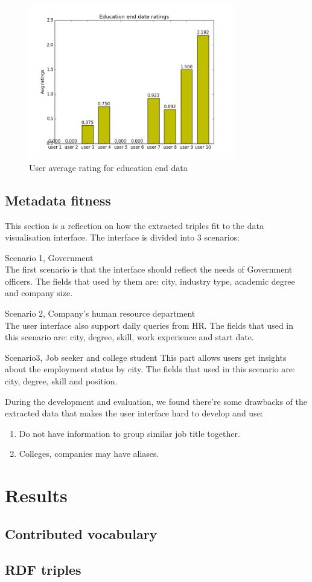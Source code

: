 \begin{figure}[H]
\centering
\includegraphics[width=90mm]{images/evaluation/average_education_end_date_score.png}
\caption{User average rating for education end data}
\label{fig:educationend}
\end{figure}

\subsection{Metadata fitness}

This section is a reflection on how the extracted triples fit to the data visualisation interface. The interface is divided into 3 scenarios: 

\begin{description}
	\item Scenario 1, Government \hfill \\
	The first scenario is that the interface should reflect the needs of Government officers. The fields that used by them are: city, industry type, academic degree and company size.
	\item Scenario 2, Company's human resource department \hfill \\
	The user interface also support daily queries from HR. The fields that used in this scenario are: city, degree, skill, work experience and start date.
	\item Scenario3, Job seeker and college student
	This part allows users get insights about the employment status by city. The fields that used in this scenario are: city, degree, skill and position.
\end{description}

During the development and evaluation, we found there're some drawbacks of the extracted data that makes the user interface hard to develop and use:
\begin{enumerate}
	\item Do not have information to group similar job title together.
	\item Colleges, companies may have aliases.
\end{enumerate}

\section{Results}

\subsection{Contributed vocabulary}

\subsection{RDF triples}